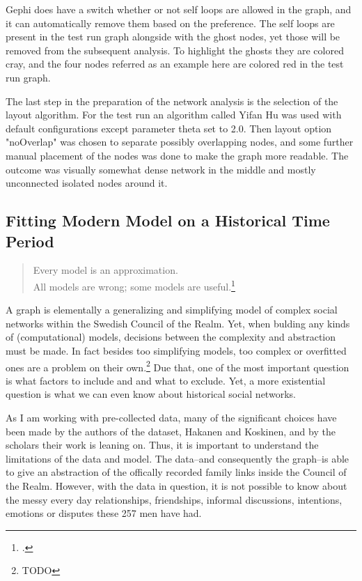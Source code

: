 Gephi does have a switch whether or not self loops are allowed in the graph, and it can automatically remove them based on the preference. The self loops are present in the test run graph alongside with the ghost nodes, yet those will be removed from the subsequent analysis. To highlight the ghosts they are colored cray, and the four nodes referred as an example here are colored red in the test run graph.

The last step in the preparation of the network analysis is the selection of the layout algorithm. For the test run an algorithm called Yifan Hu was used with default configurations except parameter theta set to 2.0. Then layout option "noOverlap" was chosen to separate possibly overlapping nodes, and some further manual placement of the nodes was done to make the graph more readable. The outcome was visually somewhat dense network in the middle and mostly unconnected isolated nodes around it. 

\subsection{Fitting Modern Model on a Historical Time Period}
\begin{quote}
	Every model is an approximation.\\
	All models are wrong; some models are useful.\footcite[prefix]{statisticsfor}
\end{quote}

A graph is elementally a generalizing and simplifying model of complex social networks within the Swedish Council of the Realm. Yet, when bulding any kinds of (computational) models, decisions between the complexity and abstraction must be made. In fact besides too simplifying models, too complex or overfitted ones are a problem on their own.\footnote{TODO} Due that, one of the most important question is what factors to include and and what to exclude. Yet, a more existential question is what we can even know about historical social networks. 

As I am working with pre-collected data, many of the significant choices have been made by the authors of the dataset, Hakanen and Koskinen, and by the scholars their work is leaning on. Thus, it is important to understand the limitations of the data and model. The data–and consequently the graph–is able to give an abstraction of the offically recorded family links inside the Council of the Realm. However, with the data in question, it is not possible to know about the messy every day relationships, friendships, informal discussions, intentions, emotions or disputes these 257 men have had. 

